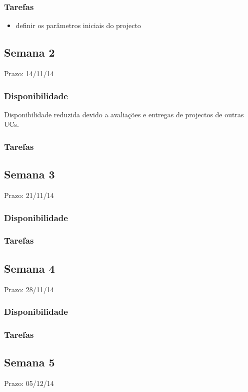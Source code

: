\documentclass[a4paper]{article}
\begin{document}
\subsubsection{Tarefas}
\begin{itemize}
\item definir os parâmetros iniciais do projecto
\end{itemize}



\subsection{Semana 2}
Prazo: 14/11/14
\subsubsection{Disponibilidade}
Disponibilidade reduzida devido a avaliações e entregas de projectos de outras UCs.

\subsubsection{Tarefas}



\subsection{Semana 3}
Prazo: 21/11/14
\subsubsection{Disponibilidade}
\subsubsection{Tarefas}

\subsection{Semana 4}
Prazo: 28/11/14
\subsubsection{Disponibilidade}
\subsubsection{Tarefas}

\subsection{Semana 5}
Prazo: 05/12/14
\end{document}
